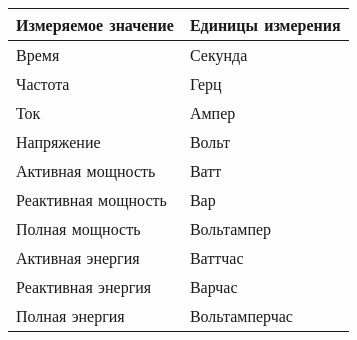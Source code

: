 \begin{center}
    \begin{tabular}{ | l | l |}
    \hline
    \textbf{Измеряемое значение} & \textbf{Единицы измерения} \\ \hline
    Время & Секунда \\ \hline
    Частота & Герц  \\ \hline
    Ток & Ампер \\ \hline
    Напряжение & Вольт \\ \hline
    Активная мощность & Ватт \\ \hline
    Реактивная мощность & Вар \\ \hline
    Полная мощность & Вольтампер \\ \hline
    Активная энергия & Ваттчас \\ \hline
    Реактивная энергия & Варчас \\ \hline
    Полная энергия & Вольтамперчас \\ \hline
    \end{tabular}
\end{center}